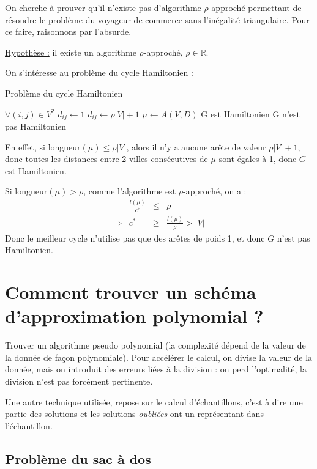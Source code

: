 \documentclass[a4paper, 11pt]{article}
\begin{document}
On cherche à prouver qu'il n'existe pas d'algorithme $\rho$-approché permettant de résoudre le
problème du voyageur de commerce sans l'inégalité triangulaire. Pour ce faire, raisonnons par 
l'absurde.

\underline{Hypothèse :} il existe un algorithme $\rho$-approché, $\rho \in \mathbb{R}$.

On s'intéresse au problème du cycle Hamiltonien :
\begin{algorithm}
	\caption{Problème du cycle Hamiltonien}
	\begin{algorithmic}[1]
		\STATE $\forall (i, j) \in V^2$
			\STATE $d_{ij} \leftarrow 1$
		\ELSE 
			\STATE $d_{ij} \leftarrow \rho|V| + 1$
		\ENDIF
		\STATE $\mu \leftarrow A(V,D)$
			\STATE G est Hamiltonien
		\ELSE
			\STATE G n'est pas Hamiltonien
		\ENDIF
	\end{algorithmic}
\end{algorithm}

En effet, si longueur$(\mu) \leq \rho|V|$, alors il n'y a aucune arête de valeur $\rho|V| + 1$, donc
toutes les distances entre 2 villes consécutives de $\mu$ sont égales à 1, donc $G$ est Hamiltonien.

Si longueur$(\mu) > \rho$, comme l'algorithme est $\rho$-approché, on a : $$
\begin{array}{lrcl}
	&\displaystyle \frac{l(\mu)}{c^*} & \leq & \rho \\
	\Rightarrow & c^* & \geq & \frac{l(\mu)}{\rho} > |V|
\end{array} $$
Donc le meilleur cycle n'utilise pas que des arêtes de poids 1, et donc $G$ n'est pas Hamiltonien.

\section{Comment trouver un schéma d'approximation polynomial ?}

Trouver un algorithme pseudo polynomial (la complexité dépend de la valeur de la donnée de façon
polynomiale). Pour accélérer le calcul, on divise la valeur de la donnée, mais on introduit des
erreurs liées à la division : on perd l'optimalité, la division n'est pas forcément pertinente.

Une autre technique utilisée, repose sur le calcul d'échantillons, c'est à dire une partie des
solutions et les solutions \emph{oubliées} ont un représentant dans l'échantillon.

\subsection{Problème du sac à dos}
\end{document}
